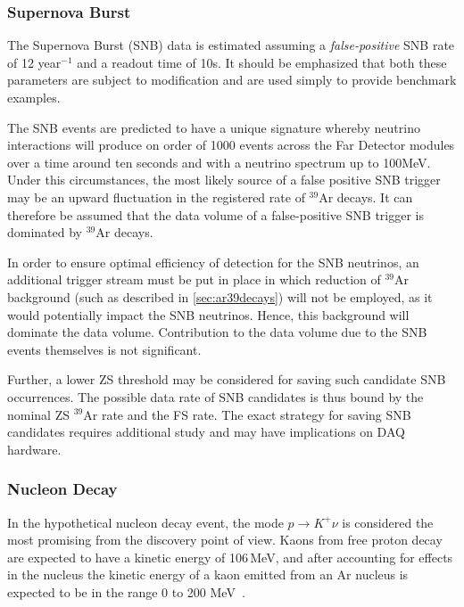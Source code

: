 \subsubsection{Supernova Burst}
\label{sec:snb-data}
The Supernova Burst (SNB) data is estimated assuming a
\textit{false-positive} SNB rate of 12 year$^{-1}$ and a readout time of
10s. It should be emphasized that both these parameters are subject to
modification and are used simply to provide benchmark examples.

The SNB events are predicted to have a unique signature whereby
neutrino interactions will produce on order of 1000 events across
the Far Detector modules over a time around ten seconds and with a
neutrino spectrum up to 100MeV. Under this circumstances, 
the most likely source of a false positive SNB trigger may be an upward
fluctuation in the registered rate of $^{39}$Ar decays.
It can therefore be assumed that the data volume of a
false-positive SNB trigger is dominated by $^{39}$Ar decays.

In order to ensure optimal efficiency of detection for the SNB neutrinos,
an  additional trigger stream must be put in place in which
reduction of $^{39}$Ar background (such as described in \ref{sec:ar39decays}) will not be employed,
as it would potentially impact the SNB neutrinos. Hence, this background 
will dominate the data volume. Contribution to the data volume due to the SNB events
themselves is not significant.

Further, a lower ZS threshold may be considered for saving such
candidate SNB occurrences. The possible data rate of SNB candidates is thus bound by the nominal
ZS $^{39}$Ar rate and the FS rate. The exact strategy for saving SNB candidates requires additional study
and may have implications on DAQ hardware.

\subsubsection{Nucleon Decay}
\label{sec:pdk-data}
In the hypothetical nucleon decay event, the mode $p \rightarrow K^+\nu$ is considered the most promising
from the discovery point of view. Kaons from free proton decay are expected to have a kinetic
energy of 106\,MeV, and after accounting for effects in the nucleus the kinetic energy of a kaon
emitted from an Ar nucleus  is expected to be in the range 0 to 200 MeV~\cite{muon_bkgd_pdk}.

